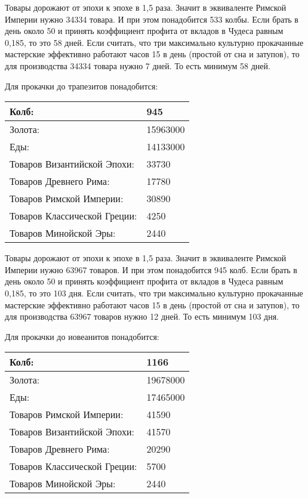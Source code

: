 Товары дорожают от эпохи к эпохе в 1,5 раза.
Значит в эквиваленте Римской Империи нужно 34334 товара.
И при этом понадобится 533 колбы. Если брать в день около 50 и принять коэффициент профита от вкладов
в Чудеса равным 0,185, то это 58 дней.
Если считать, что три максимально культурно прокачанные мастерские эффективно работают часов 15 в день (простой от сна и затупов),
то для производства 34334 товара нужно 7 дней.
То есть минимум 58 дней.


Для прокачки до трапезитов понадобится:

\begin{center}
    \begin{tabular}[h!]{|l|l|}
        \hline
        Колб:   & 945 \\\hline
        Золота: & 15963000 \\\hline
        Еды:    & 14133000 \\\hline
        Товаров Византийской Эпохи: & 33730 \\\hline
        Товаров Древнего Рима: & 17780 \\\hline
        Товаров Римской Империи: & 30890 \\\hline
        Товаров Классической Греции: & 4250 \\\hline
        Товаров Минойской Эры: & 2440 \\\hline
    \end{tabular}
\end{center}

Товары дорожают от эпохи к эпохе в 1,5 раза.
Значит в эквиваленте Римской Империи нужно 63967 товаров.
И при этом понадобится 945 колб. Если брать в день около 50 и принять коэффициент профита от вкладов
в Чудеса равным 0,185, то это 103 дня.
Если считать, что три максимально культурно прокачанные мастерские эффективно работают часов 15 в день (простой от сна и затупов),
то для производства 63967 товаров нужно 12 дней.
То есть минимум 103 дня.


Для прокачки до иовеанитов понадобится:

\begin{center}
    \begin{tabular}[h!]{|l|l|}
        \hline
        Колб:   & 1166 \\\hline
        Золота: & 19678000 \\\hline
        Еды:    & 17465000 \\\hline
        Товаров Римской Империи: & 41590 \\\hline
        Товаров Византийской Эпохи: & 41570 \\\hline
        Товаров Древнего Рима: & 20290 \\\hline
        Товаров Классической Греции: & 5700 \\\hline
        Товаров Минойской Эры: & 2440 \\\hline
    \end{tabular}
\end{center}

